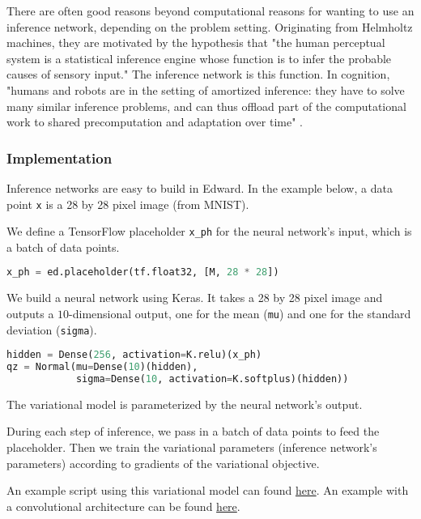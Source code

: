 There are often good reasons beyond computational reasons
for wanting to use an inference network, depending on the problem
setting.
Originating from
Helmholtz machines, they are motivated by the hypothesis
that "the human perceptual system is a statistical inference engine
whose function is to infer the probable causes of sensory input." The
inference network is this function.
In cognition, "humans and robots are in the setting of amortized
inference: they have to solve many similar inference problems, and can
thus offload part of the computational work to shared precomputation
and adaptation over time" \citep{stuhlmuller2013learning}.

\subsubsection{Implementation}

Inference networks are easy to build in Edward.
In the example below, a data point \texttt{x} is a 28 by 28 pixel
image (from MNIST).

We define a TensorFlow placeholder \texttt{x_ph} for the neural
network's input, which is a batch of data points.
\begin{lstlisting}[language=Python]
x_ph = ed.placeholder(tf.float32, [M, 28 * 28])
\end{lstlisting}

We build a neural network using Keras.
It takes a 28 by 28 pixel image and outputs a $10$-dimensional
output, one for the mean (\texttt{mu}) and one for the standard
deviation (\texttt{sigma}).
\begin{lstlisting}[language=Python]
hidden = Dense(256, activation=K.relu)(x_ph)
qz = Normal(mu=Dense(10)(hidden),
            sigma=Dense(10, activation=K.softplus)(hidden))
\end{lstlisting}
The variational model is parameterized by the neural network's
output.

During each step of inference, we pass in a batch of data points to feed the
placeholder. Then we train the variational parameters (inference
network's parameters) according to
gradients of the variational objective.

An example script using this variational model can found
\href{https://github.com/blei-lab/edward/blob/master/examples/vae.py}
{here}.
An example with a convolutional architecture can be found
\href{https://github.com/blei-lab/edward/blob/master/examples/vae_convolutional_prettytensor.py}
{here}.

